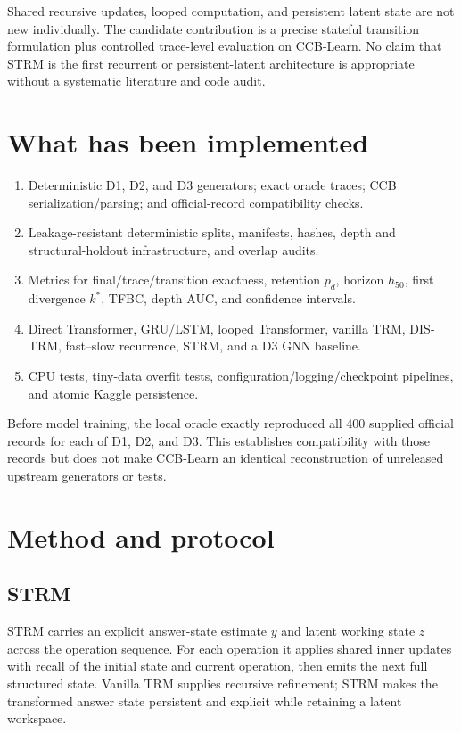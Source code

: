 \documentclass[11pt]{article}
\newcommand{\pd}{\ensuremath{p_d}}
\newcommand{\hfive}{\ensuremath{h_{50}}}
\begin{document}
Shared recursive updates, looped computation, and persistent latent state are
not new individually. The candidate contribution is a precise stateful
transition formulation plus controlled trace-level evaluation on CCB-Learn.
No claim that STRM is the first recurrent or persistent-latent architecture is
appropriate without a systematic literature and code audit.

\section{What has been implemented}
\begin{enumerate}
\item Deterministic D1, D2, and D3 generators; exact oracle traces; CCB
serialization/parsing; and official-record compatibility checks.
\item Leakage-resistant deterministic splits, manifests, hashes, depth and
structural-holdout infrastructure, and overlap audits.
\item Metrics for final/trace/transition exactness, retention \pd, horizon
\hfive, first divergence $k^*$, TFBC, depth AUC, and confidence intervals.
\item Direct Transformer, GRU/LSTM, looped Transformer, vanilla TRM,
DIS-TRM, fast--slow recurrence, STRM, and a D3 GNN baseline.
\item CPU tests, tiny-data overfit tests, configuration/logging/checkpoint
pipelines, and atomic Kaggle persistence.
\end{enumerate}

Before model training, the local oracle exactly reproduced all 400 supplied
official records for each of D1, D2, and D3. This establishes compatibility
with those records but does not make CCB-Learn an identical reconstruction of
unreleased upstream generators or tests.

\section{Method and protocol}
\subsection{STRM}
STRM carries an explicit answer-state estimate $y$ and latent working state
$z$ across the operation sequence. For each operation it applies shared inner
updates with recall of the initial state and current operation, then emits the
next full structured state. Vanilla TRM supplies recursive refinement; STRM
makes the transformed answer state persistent and explicit while retaining a
latent workspace.
\end{document}
